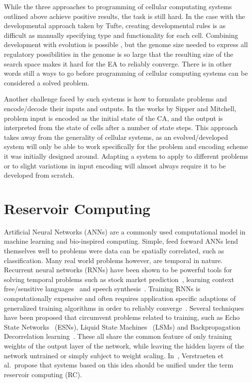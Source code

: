 While the three approaches to programming of cellular computating systems
outlined above achieve positive results, the task is still hard. In the case
with the developmental approach taken by Tufte, creating developmental rules is
as difficult as manually specifying type and functionality for each cell.
Combining development with evolution is possible \cite{7008733}, but the genome
size needed to express all regulatory possibilities in the genome is so large
that the resulting size of the search space makes it hard for the EA to reliably
converge. There is in other words still a ways to go before programming of
cellular computing systems can be considered a solved problem.

Another challenge faced by such systems is how to formulate problems and
encode/decode their inputs and outputs. In the works by Sipper and Mitchell,
problem input is encoded as the initial state of the CA, and the output is
interpreted from the state of cells after a number of state steps. This approach
takes away from the generality of cellular systems, as an evolved/developed
system will only be able to work specifically for the problem and encoding
scheme it was initially designed around. Adapting a system to apply to different
problems or to slight variations in input encoding will almost always require it
to be developed from scratch.

\section{Reservoir Computing}
\label{sec:reservoir-computing}

Artificial Neural Networks (ANNs) are a commonly used computational model in
machine learning and bio-inspired computing. Simple, feed forward ANNs lend
themselves well to problems were data can be spatially correlated, such as
classification. Many real world problems however, are temporal in nature.
Recurrent neural networks (RNNs) have been shown to be powerful tools for
solving temporal problems such as stock market prediction~\cite{Lawrence2001},
learning context free/sensitive languages~\cite{Gers2001} and speech
synthesis~\cite{Wu2016}. Training RNNs is computationally expensive and often
requires application specific adaptions of generalized training algorithms in
order to reliably converge~\cite{Hammer2002}. Several techniques have been
proposed that circumvent problems related to training, such as Echo State
Networks~\cite{Jaeger2001} (ESNs), Liquid State Machines~\cite{Maass2002} (LSMs)
and Backpropagation Decorrelation learning~\cite{Steil2004}. These all share the
common feature of only training weights of the output layer of the network,
while leaving the hidden layers of the network untrained or simply subject to
weight scaling. In~\cite{Verstraeten2007}, Verstraeten et al.\ propose that
systems based on this idea should be unified under the term reservoir computing
(RC).

